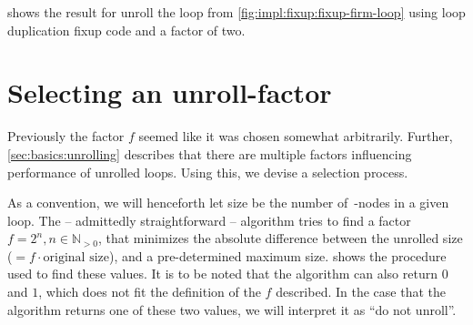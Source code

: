  shows the result for unroll the loop from \cref{fig:impl:fixup:fixup-firm-loop} using loop duplication fixup code and a factor of two.








\section{Selecting an unroll-factor}\label{sec:impl:sel-factor}

Previously the factor $f$ seemed like it was chosen somewhat arbitrarily.
Further, \cref{sec:basics:unrolling} describes that there are multiple factors influencing performance of unrolled loops.
Using this, we devise a selection process.

As a convention, we will henceforth let size be the number of~\libFIRM-nodes in a given loop.
The -- admittedly straightforward -- algorithm tries to find a factor $f = 2^n, n \in \mathbb{N}_{>0}$, that minimizes the absolute difference between the unrolled size ($= f \cdot \text{original size}$), and a pre-determined maximum size.
 shows the procedure used to find these values.
It is to be noted that the algorithm can also return $0$ and $1$, which does not fit the definition of the $f$ described.
In the case that the algorithm returns one of these two values, we will interpret it as ``do not unroll''.

